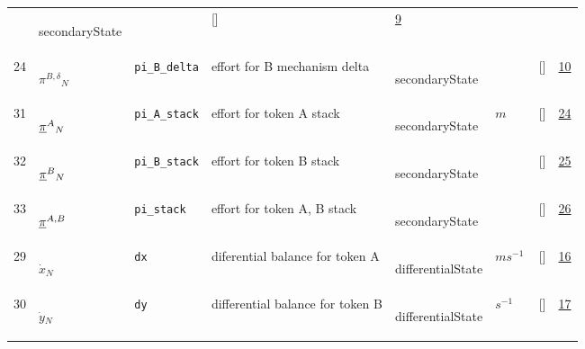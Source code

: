 \begin{longtable}{|p{1cm}|p{3cm}|p{3cm}|p{7cm}|p{3.0cm}|p{3cm}|p{2cm}|p{1cm}|}
             & \begin{lay}secondaryState \end{lay}
             & $  $
             & []
             & \hyperlink{"e:9"}{ 9 }
                 \\
    24
             & \hypertarget{"v:24"}{ $ {{\pi^{B,\delta}}}{_{N}} $}
             & \verb|pi_B_delta|
             & effort for B mechanism delta
             & \begin{lay}secondaryState \end{lay}
             & $  $
             & []
             & \hyperlink{"e:10"}{ 10 }
                 \\
    31
             & \hypertarget{"v:31"}{ $ {{{{\protect\underline{\bf{\pi}}}}^A}}{_{N}} $}
             & \verb|pi_A_stack|
             & effort for token A stack
             & \begin{lay}secondaryState \end{lay}
             & $ m  $
             & []
             & \hyperlink{"e:24"}{ 24 }
                 \\
    32
             & \hypertarget{"v:32"}{ $ {{{{\protect\underline{\bf{\pi}}}}^B}}{_{N}} $}
             & \verb|pi_B_stack|
             & effort for token B stack
             & \begin{lay}secondaryState \end{lay}
             & $  $
             & []
             & \hyperlink{"e:25"}{ 25 }
                 \\
    33
             & \hypertarget{"v:33"}{ $ {{{{\protect\underline{\bf{\pi}}}}^{A,B}}}{_{}} $}
             & \verb|pi_stack|
             & effort for token A, B stack
             & \begin{lay}secondaryState \end{lay}
             & $  $
             & []
             & \hyperlink{"e:26"}{ 26 }
                 \\
    29
             & \hypertarget{"v:29"}{ $ {{\dot{x}}}{_{N}} $}
             & \verb|dx|
             & diferential balance for token A
             & \begin{lay}differentialState \end{lay}
             & $ m s^{-1} \, $
             & []
             & \hyperlink{"e:16"}{ 16 }
                 \\
    30
             & \hypertarget{"v:30"}{ $ {{\dot{y}}}{_{N}} $}
             & \verb|dy|
             & differential balance for token B
             & \begin{lay}differentialState \end{lay}
             & $ s^{-1} \, $
             & []
             & \hyperlink{"e:17"}{ 17 }
                 \\
    \end{longtable}